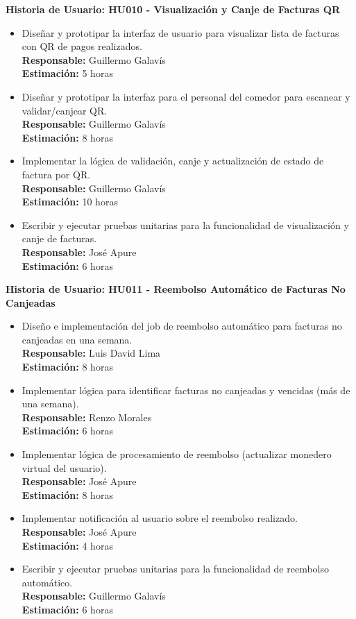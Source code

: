 \documentclass[12pt]{article}
\begin{document}
\pagebreak

\textbf{Historia de Usuario: HU010 - Visualización y Canje de Facturas QR}
\begin{itemize}
	\item Diseñar y prototipar la interfaz de usuario para visualizar lista de facturas con QR de pagos realizados. \\
	\textbf{Responsable:} Guillermo Galavís \\
	\textbf{Estimación:} 5 horas
	\item Diseñar y prototipar la interfaz para el personal del comedor para escanear y validar/canjear QR. \\
	\textbf{Responsable:} Guillermo Galavís \\
	\textbf{Estimación:} 8 horas
	\item Implementar la lógica de validación, canje y actualización de estado de factura por QR. \\
	\textbf{Responsable:} Guillermo Galavís \\
	\textbf{Estimación:} 10 horas
	\item Escribir y ejecutar pruebas unitarias para la funcionalidad de visualización y canje de facturas. \\
	\textbf{Responsable:} José Apure \\
	\textbf{Estimación:} 6 horas
\end{itemize}

\textbf{Historia de Usuario: HU011 - Reembolso Automático de Facturas No Canjeadas}
\begin{itemize}
	\item Diseño e implementación del job de reembolso automático para facturas no canjeadas en una semana. \\
	\textbf{Responsable:} Luis David Lima \\
	\textbf{Estimación:} 8 horas
	\item Implementar lógica para identificar facturas no canjeadas y vencidas (más de una semana). \\
	\textbf{Responsable:} Renzo Morales \\
	\textbf{Estimación:} 6 horas
	\item Implementar lógica de procesamiento de reembolso (actualizar monedero virtual del usuario). \\
	\textbf{Responsable:} José Apure \\
	\textbf{Estimación:} 8 horas
	\item Implementar notificación al usuario sobre el reembolso realizado. \\
	\textbf{Responsable:} José Apure \\
	\textbf{Estimación:} 4 horas
	\item Escribir y ejecutar pruebas unitarias para la funcionalidad de reembolso automático. \\
	\textbf{Responsable:} Guillermo Galavís \\
	\textbf{Estimación:} 6 horas
\end{itemize}
\end{document}
